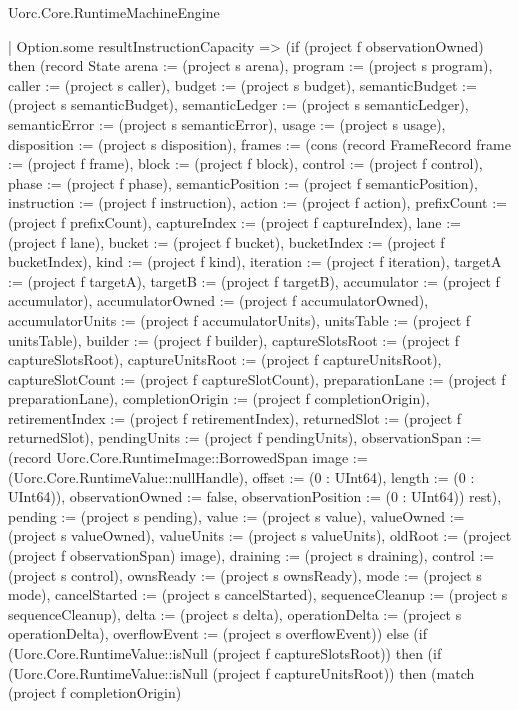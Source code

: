 \begin{lexlean}{Uorc.Core.RuntimeMachineEngine}
\begin{semanticmodule}
{        | Option.some resultInstructionCapacity => (if (project f observationOwned) then (record State {arena := (project s arena), program := (project s program), caller := (project s caller), budget := (project s budget), semanticBudget := (project s semanticBudget), semanticLedger := (project s semanticLedger), semanticError := (project s semanticError), usage := (project s usage), disposition := (project s disposition), frames := (cons (record FrameRecord {frame := (project f frame), block := (project f block), control := (project f control), phase := (project f phase), semanticPosition := (project f semanticPosition), instruction := (project f instruction), action := (project f action), prefixCount := (project f prefixCount), captureIndex := (project f captureIndex), lane := (project f lane), bucket := (project f bucket), bucketIndex := (project f bucketIndex), kind := (project f kind), iteration := (project f iteration), targetA := (project f targetA), targetB := (project f targetB), accumulator := (project f accumulator), accumulatorOwned := (project f accumulatorOwned), accumulatorUnits := (project f accumulatorUnits), unitsTable := (project f unitsTable), builder := (project f builder), captureSlotsRoot := (project f captureSlotsRoot), captureUnitsRoot := (project f captureUnitsRoot), captureSlotCount := (project f captureSlotCount), preparationLane := (project f preparationLane), completionOrigin := (project f completionOrigin), retirementIndex := (project f retirementIndex), returnedSlot := (project f returnedSlot), pendingUnits := (project f pendingUnits), observationSpan := (record Uorc.Core.RuntimeImage::BorrowedSpan {image := (Uorc.Core.RuntimeValue::nullHandle), offset := (0 : UInt64), length := (0 : UInt64)}), observationOwned := false, observationPosition := (0 : UInt64)}) rest), pending := (project s pending), value := (project s value), valueOwned := (project s valueOwned), valueUnits := (project s valueUnits), oldRoot := (project (project f observationSpan) image), draining := (project s draining), control := (project s control), ownsReady := (project s ownsReady), mode := (project s mode), cancelStarted := (project s cancelStarted), sequenceCleanup := (project s sequenceCleanup), delta := (project s delta), operationDelta := (project s operationDelta), overflowEvent := (project s overflowEvent)}) else (if (Uorc.Core.RuntimeValue::isNull (project f captureSlotsRoot)) then (if (Uorc.Core.RuntimeValue::isNull (project f captureUnitsRoot)) then (match (project f completionOrigin)
}
\end{semanticmodule}
\end{lexlean}
